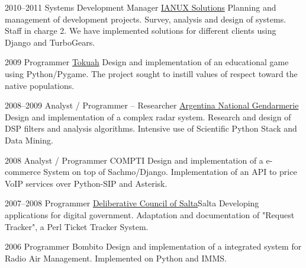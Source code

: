 \documentclass[11pt,a4paper]{moderncv}
\begin{document}
    \cventry
        {2010--2011}
        {Systems Development Manager}
        {\href{http://ianux.com.ar}{IANUX Solutions}} {} {}
        {
            Planning and management of development projects. Survey, analysis
                and design of systems. Staff in charge 2. We have implemented
                solutions for different clients using Django and TurboGears.
        }

    \cventry
        {2009}
        {Programmer}
        {\href{http://tokuah.com.ar}{Tokuah}} {} {}
        {
            Design and implementation of an educational game using
                Python/Pygame.
            The project sought to instill values of respect                      %
                toward the native populations.                                   %
        }

    \cventry
        {2008--2009}
        {Analyst / Programmer -- Researcher}
        {\href{http://www.gendarmeria.gov.ar}{Argentina National Gendarmerie}} {} {}
        {
            Design and implementation of a complex radar system. Research and    %
                design of DSP filters and analysis algorithms.                   %
            Intensive use of Scientific Python Stack and Data Mining.            %
        }

    \cventry
        {2008}
        {Analyst / Programmer}
        {COMPTI} {} {}
        {
            Design and implementation of a e-commerce System on top of           %
            Sachmo/Django.                                                       %
            Implementation of an API to price VoIP services over Python-SIP and  %
            Asterisk.                                                            %
        }

    \cventry
        {2007--2008}
        {Programmer}
        {\href{http://softwarelibre.unsa.edu.ar/dsa/}{Deliberative Council of Salta}}{Salta}{}
        {
            Developing applications for digital government. Adaptation and       %
                documentation of "Request Tracker", a Perl Ticket Tracker        %
                System.                                                          %
        }

    \cventry
        {2006}
        {Programmer}
        {Bombito} {} {}
        {
            Design and implementation of a integrated system for Radio Air       %
            Management.                                                          %
            Implemented on Python and IMMS.                                      %
        }
\end{document}
